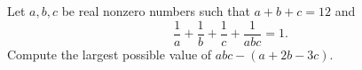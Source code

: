 Let $a,b,c$ be real nonzero numbers such that $a+b+c=12$ and \[\frac{1}{a}+\frac{1}{b}+\frac{1}{c}+\frac{1}{abc}=1.\] Compute the largest possible value of $abc-\left(a+2b-3c\right)$.
